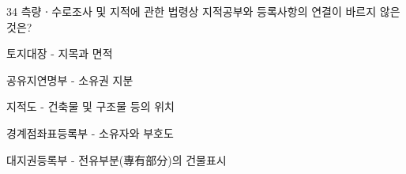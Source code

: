 \begin{question}{34}
측량ㆍ수로조사 및 지적에 관한 법령상 지적공부와 등록사항의 연결이 바르지 않은 것은?
\begin{choices}
  \item 토지대장 - 지목과 면적
  \item 공유지연명부 - 소유권 지분
  \item 지적도 - 건축물 및 구조물 등의 위치
  \item 경계점좌표등록부 - 소유자와 부호도
  \item 대지권등록부 - 전유부분(專有部分)의 건물표시
\end{choices}
\end{question}
